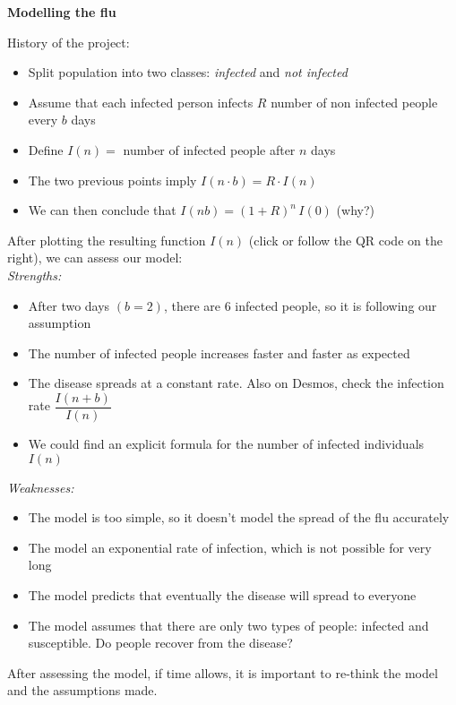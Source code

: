 \begin{example}\textbf{Modelling the flu}

History of the project:
\begin{itemize}
	\item Split population into two classes: \emph{infected} and \emph{not infected}
	\item Assume that each infected person infects $R$ number of non infected people every $b$ days
	\item Define $I(n) = $ number of infected people after $n$ days
	\item The two previous points imply \quad $I(n \cdot b) = R \cdot I(n)$
	\item We can then conclude that \quad $I(n b) = (1+R)^n \, I(0)$ \hfill (why?) \\
\end{itemize}

After plotting the resulting function $I(n)$ (click or follow the QR code on the right), we can assess our model: \\

\emph{Strengths:}
\begin{itemize}
	\item After two days $(b=2)$, there are 6 infected people, so it is following our assumption
	\item The number of infected people increases faster and faster as expected 
	\item The disease spreads at a constant rate. Also on Desmos, check the infection rate $\dfrac{I(n+b)}{I(n)}$
	\item We could find an explicit formula for the number of infected individuals $I(n)$ \\
\end{itemize}


\emph{Weaknesses:}
\begin{itemize}
	\item The model is too simple, so it doesn't model the spread of the flu accurately
	\item The model an exponential rate of infection, which is not possible for very long
	\item The model predicts that eventually the disease will spread to everyone
	\item The model assumes that there are only two types of people: infected and susceptible. Do people recover from the disease?
\end{itemize}

\end{example}




After assessing the model, if time allows, it is important to re-think the model and the assumptions made.


